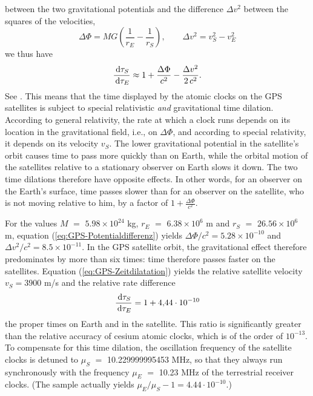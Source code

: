 between the two gravitational potentials and the difference
$\Delta v^2$ between the squares of the velocities,
\begin{equation}
	\Delta \Phi
	= {M G}
	\left(\frac{1}{r_E} - \frac{1}{r_S}\right)
	,
	\qquad
	\Delta v^2 = v_S^2 - v_E^2
	\label{eq:GPS-Potentialdifferenz}
\end{equation}
we thus have
\begin{equation}
	\frac{\,\mathrm{d} \tau_S}{\,\mathrm{d} \tau_E}
	\approx
	1 + \frac{\Delta \Phi}{c^2} - \frac{\Delta v^2}{2\,c^2}
	.
	\label{eq:GPS-Zeitdilatation}
\end{equation}
See \cite[Gl. (14.12)]{Sonne-Weiss-2013}.
This means that the time displayed by the atomic clocks on the GPS satellites is subject to special relativistic \emph{and} gravitational time dilation. According to general relativity, the rate at which a clock runs depends on its location in the gravitational field,
i.e., on $\Delta \Phi$, 
and according to special relativity, it depends on its velocity $v_S$.
The lower gravitational potential in the satellite's orbit causes time to pass more quickly than on Earth, while the orbital motion of the satellites relative to a stationary observer on Earth slows it down.
The two time dilations therefore have opposite effects.
In other words, for an observer on the Earth's surface, 
time passes 
slower than for an observer on the satellite, who is not moving relative to him, 
by a factor of $1 + \frac{\Delta \Phi}{c^2}$.

For the values
$M$ $=$ $5.98 \times 10^{24}$ kg, 
$r_E$ $=$ $6.38 \times 10^{6}$ m
and $r_S$ $=$ $26.56 \times 10^{6}$ m,
equation (\ref{eq:GPS-Potentialdifferenz}) yields
$\Delta \Phi/c^2 = 5.28 \times 10^{-10}$
and
$\Delta v^2/c^2 = 8.5 \times 10^{-11}$.
In the GPS satellite orbit, the gravitational effect therefore predominates 
by more than six times: time therefore passes faster on the satellites. 
Equation (\ref{eq:GPS-Zeitdilatation}) yields
the relative satellite velocity $v_S = 3900$ m/s
and the relative rate difference  
\begin{equation}
	\frac{\,\mathrm{d} \tau_S}{\,\mathrm{d} \tau_E}
	= 1 + 4{,}44 \cdot 10^{-10}
\end{equation}
the proper times on Earth and in the satellite.
This ratio is significantly greater than the relative accuracy of cesium atomic clocks, which is of the order of $10^{-13}$.
To compensate for this time dilation, the oscillation frequency
of the satellite clocks is detuned to $\mu_{S}$ $=$ 10.229999995453 MHz, 
so that they always run synchronously with the frequency $\mu_{E}$ $=$ 10.23 MHz
of the terrestrial receiver clocks.
(The sample actually yields $\mu_E/\mu_S - 1 = 4.44 \cdot 10^{-10}$.)

